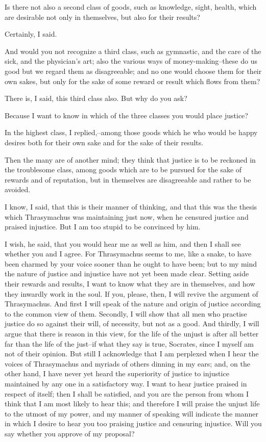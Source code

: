 Is there not also a second class of goods, such as knowledge, sight,
health, which are desirable not only in themselves, but also for their
results?

Certainly, I said.

And would you not recognize a third class, such as gymnastic, and the
care of the sick, and the physician's art; also the various ways of
money-making--these do us good but we regard them as disagreeable; and
no one would choose them for their own sakes, but only for the sake of
some reward or result which flows from them?

There is, I said, this third class also. But why do you ask?

Because I want to know in which of the three classes you would place
justice?

In the highest class, I replied,--among those goods which he who would
be happy desires both for their own sake and for the sake of their
results.

Then the many are of another mind; they think that justice is to be
reckoned in the troublesome class, among goods which are to be pursued
for the sake of rewards and of reputation, but in themselves are
disagreeable and rather to be avoided.

I know, I said, that this is their manner of thinking, and that this was
the thesis which Thrasymachus was maintaining just now, when he censured
justice and praised injustice. But I am too stupid to be convinced by
him.

I wish, he said, that you would hear me as well as him, and then I shall
see whether you and I agree. For Thrasymachus seems to me, like a snake,
to have been charmed by your voice sooner than he ought to have been;
but to my mind the nature of justice and injustice have not yet been
made clear. Setting aside their rewards and results, I want to know what
they are in themselves, and how they inwardly work in the soul. If you,
please, then, I will revive the argument of Thrasymachus. And first I
will speak of the nature and origin of justice according to the common
view of them. Secondly, I will show that all men who practise justice do
so against their will, of necessity, but not as a good. And thirdly, I
will argue that there is reason in this view, for the life of the unjust
is after all better far than the life of the just--if what they say
is true, Socrates, since I myself am not of their opinion. But still I
acknowledge that I am perplexed when I hear the voices of Thrasymachus
and myriads of others dinning in my ears; and, on the other hand, I have
never yet heard the superiority of justice to injustice maintained by
any one in a satisfactory way. I want to hear justice praised in respect
of itself; then I shall be satisfied, and you are the person from whom
I think that I am most likely to hear this; and therefore I will praise
the unjust life to the utmost of my power, and my manner of speaking
will indicate the manner in which I desire to hear you too praising
justice and censuring injustice. Will you say whether you approve of my
proposal?

